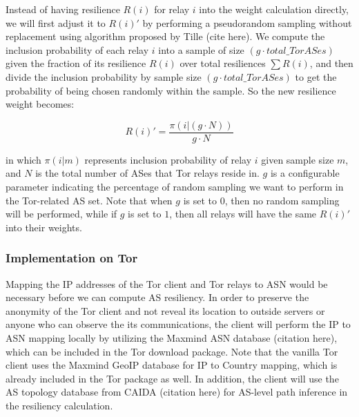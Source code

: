 Instead of having resilience $R(i)$ for relay $i$ into the weight calculation directly, we will first adjust it to $R(i)\prime$ by performing a pseudorandom sampling without replacement using algorithm proposed by Tille (cite here). We compute the inclusion probability of each relay $i$ into a sample of size $(g \cdot total\_TorASes)$ given the fraction of its resilience $R(i)$ over total resiliences $\sum R(i)$, and then divide the inclusion probability by sample size $(g \cdot total\_TorASes)$ to get the probability of being chosen randomly within the sample. So the new resilience weight becomes:

\begin{equation*}
R(i) \prime = \frac {\pi(i | (g \cdot N))} {g \cdot N}
\end{equation*}

in which $\pi(i | m)$ represents inclusion probability of relay $i$ given sample size $m$, and $N$ is the total number of ASes that Tor relays reside in. $g$ is a configurable parameter indicating the percentage of random sampling we want to perform in the Tor-related AS set. Note that when $g$ is set to $0$, then no random sampling will be performed, while if $g$ is set to $1$, then all relays will have the same $R(i)\prime$ into their weights.


\subsubsection{Implementation on Tor}
Mapping the IP addresses of the Tor client and Tor relays to ASN would be necessary before we can compute AS resiliency. In order to preserve the anonymity of the Tor client and not reveal its location to outside servers or anyone who can observe the its communications, the client will perform the IP to ASN mapping locally by utilizing the Maxmind ASN database (citation here), which can be included in the Tor download package. Note that the vanilla Tor client uses the Maxmind GeoIP database for IP to Country mapping, which is already included in the Tor package as well. In addition, the client will use the AS topology database from CAIDA (citation here) for AS-level path inference in the resiliency calculation. 

